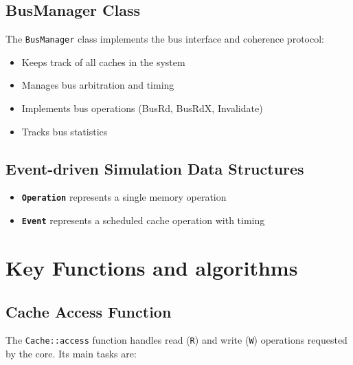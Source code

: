 \documentclass[a4paper,12pt]{article}
\begin{document}
\subsection{BusManager Class}
The \texttt{BusManager} class implements the bus interface and coherence protocol:
\begin{itemize}
\vspace{-0.5mm}
    \item Keeps track of all caches in the system
    \vspace{-3mm}
\item Manages bus arbitration and timing
\vspace{-3mm}
\item Implements bus operations (BusRd, BusRdX, Invalidate)
\vspace{-3mm}
\item Tracks bus statistics
\end{itemize}
\subsection{Event-driven Simulation Data Structures}
\begin{itemize}
    \item \texttt{\textbf{Operation}} represents a single memory operation
    \vspace{-2.8mm}
    \item \texttt{\textbf{Event}} represents a scheduled cache operation with timing
\end{itemize}
\section{Key Functions and algorithms}
\subsection{Cache Access Function}

The \texttt{Cache::access} function handles read (\texttt{R}) and write (\texttt{W}) operations requested by the core. Its main tasks are:
\end{document}
